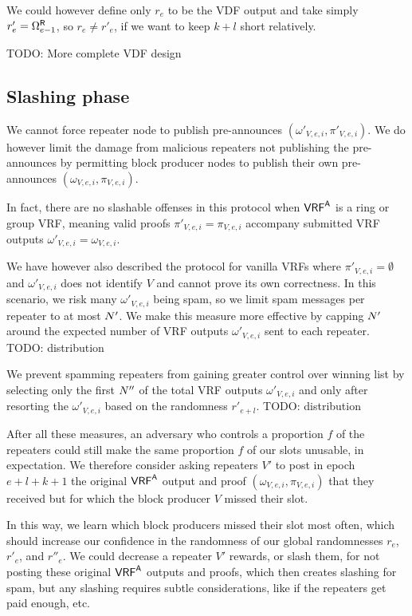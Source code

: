We could however define only $r_e$ to be the VDF output and take simply $r'_e = \Omega^{\mathsf{R}}_{e-1}$, so $r_e \ne r'_e$, if we want to keep $k+l$ short relatively.  

TODO: More complete VDF design


\subsection{Slashing phase}\label{subsec:slashing}

We cannot force repeater node to publish pre-announces $(\omega'_{V,e,i},\pi'_{V,e,i})$.  We do however limit the damage from malicious repeaters not publishing the pre-announces by permitting block producer nodes to publish their own pre-announces $(\omega_{V,e,i},\pi_{V,e,i})$.  

In fact, there are no slashable offenses in this protocol when $\mathsf{VRF}^{\mathsf{A}}$ is a ring or group VRF, meaning valid proofs $\pi'_{V,e,i} = \pi_{V,e,i}$ accompany submitted VRF outputs $\omega'_{V,e,i} = \omega_{V,e,i}$.

We have however also described the protocol for vanilla VRFs where $\pi'_{V,e,i} = \emptyset$ and $\omega'_{V,e,i}$ does not identify $V$ and cannot prove its own correctness.  In this scenario, we risk many $\omega'_{V,e,i}$ being spam, so we limit spam messages per repeater to at most $N'$.  We make this measure more effective by capping $N'$ around the expected number of VRF outputs $\omega'_{V,e,i}$ sent to each repeater.  TODO: distribution

We prevent spamming repeaters from gaining greater control over winning list by selecting only the first $N''$ of the total VRF outputs $\omega'_{V,e,i}$ and only after resorting the $\omega'_{V,e,i}$ based on the randomness $r'_{e+l}$.  TODO: distribution 

After all these measures, an adversary who controls a proportion $f$ of the repeaters could still make the same proportion $f$ of our slots unusable, in expectation.  We therefore consider asking repeaters $V'$ to post in epoch $e+l+k+1$ the original $\mathsf{VRF}^{\mathsf{A}}$ output and proof $(\omega_{V,e,i},\pi_{V,e,i})$ that they received but for which the block producer $V$ missed their slot.  

In this way, we learn which block producers missed their slot most often, which should increase our confidence in the randomness of our global randomnesses $r_e$, $r'_e$, and $r''_e$.  We could decrease a repeater $V'$ rewards, or slash them, for not posting these original $\mathsf{VRF}^{\mathsf{A}}$ outputs and proofs, which then creates slashing for spam, but any slashing requires subtle considerations, like if the repeaters get paid enough, etc.




